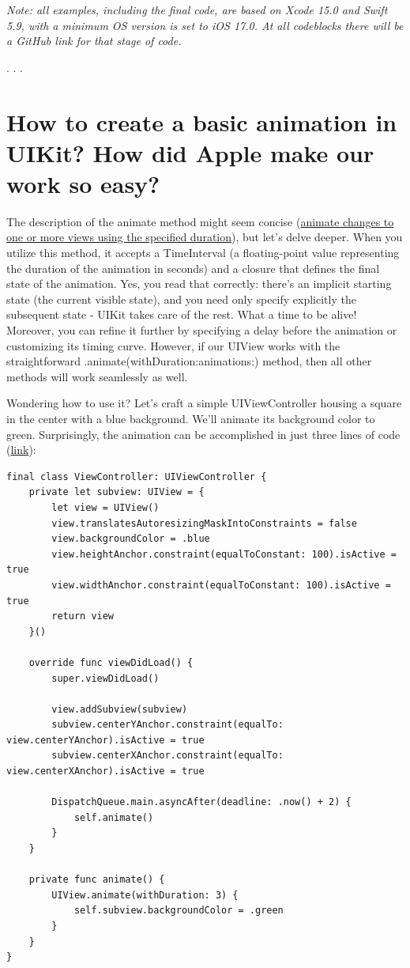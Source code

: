 \documentclass{article}
\newcommand{\separator}{\vspace{5mm}\centerline{. . .}\vspace{5mm}}
\begin{document}
\emph{Note: all examples, including the final code, are based on Xcode 15.0 and Swift 5.9, with a minimum OS version is set to iOS 17.0. At all codeblocks there will be a GitHub link for that stage of code.}

\separator

\section{How to create a basic animation in UIKit? How did Apple make our work so easy?}
\label{sec:part1}

The description of the animate method might seem concise (\href{https://developer.apple.com/documentation/uikit/uiview/1622418-animate}{animate changes to one or more views using the specified duration}), but let's delve deeper. When you utilize this method, it accepts a TimeInterval (a floating-point value representing the duration of the animation in seconds) and a closure that defines the final state of the animation. Yes, you read that correctly: there's an implicit starting state (the current visible state), and you need only specify explicitly the subsequent state - UIKit takes care of the rest. What a time to be alive! Moreover, you can refine it further by specifying a delay before the animation or customizing its timing curve. However, if our UIView works with the straightforward .animate(withDuration:animations:) method, then all other methods will work seamlessly as well.

Wondering how to use it? Let's craft a simple UIViewController housing a square in the center with a blue background. We'll animate its background color to green. Surprisingly, the animation can be accomplished in just three lines of code (\href{https://github.com/stateman92/Medium-AnimatableProperties/commit/3714855020a3933e59fe69ef6718389eb056ba74}{link}):

\begin{lstlisting}
final class ViewController: UIViewController {
    private let subview: UIView = {
        let view = UIView()
        view.translatesAutoresizingMaskIntoConstraints = false
        view.backgroundColor = .blue
        view.heightAnchor.constraint(equalToConstant: 100).isActive = true
        view.widthAnchor.constraint(equalToConstant: 100).isActive = true
        return view
    }()

    override func viewDidLoad() {
        super.viewDidLoad()

        view.addSubview(subview)
        subview.centerYAnchor.constraint(equalTo: view.centerYAnchor).isActive = true
        subview.centerXAnchor.constraint(equalTo: view.centerXAnchor).isActive = true

        DispatchQueue.main.asyncAfter(deadline: .now() + 2) {
            self.animate()
        }
    }

    private func animate() {
        UIView.animate(withDuration: 3) {
            self.subview.backgroundColor = .green
        }
    }
}
\end{lstlisting}
\end{document}
